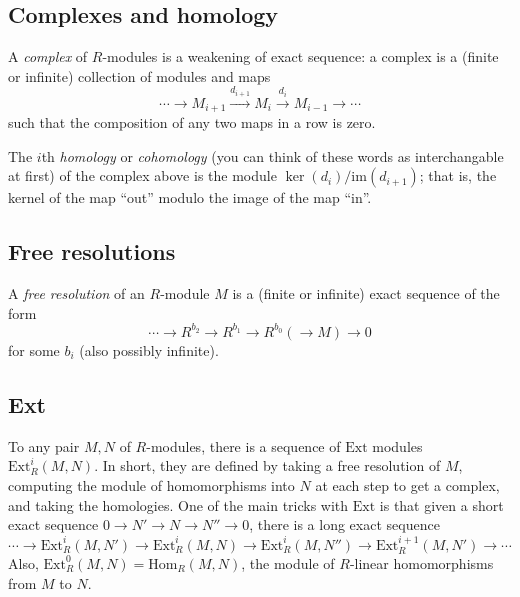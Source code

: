 \documentclass[12pt]{amsart}
\begin{document}
\subsection*{Complexes and homology} A \emph{complex} of $R$-modules is a weakening of exact sequence: a complex is a (finite or infinite) collection of modules and maps
\[ \cdots  \rightarrow M_{i+1} \xrightarrow{d_{i+1}} M_{i} \xrightarrow{d_{i}} M_{i-1} \rightarrow \cdots\]
such that the composition of any two maps in a row is zero.

The $i$th \emph{homology} or \emph{cohomology} (you can think of these words as interchangable at first) of the complex above is the module $\ker(d_i)/\mathrm{im}(d_{i+1})$; that is, the kernel of the map ``out'' modulo the image of the map ``in''.

\subsection*{Free resolutions} A \emph{free resolution} of an $R$-module $M$ is a (finite or infinite) exact sequence of the form
\[ \cdots\to  R^{b_2} \rightarrow R^{b_1} \rightarrow R^{b_0}(  \rightarrow M) \to 0\]
for some $b_i$ (also possibly infinite). 



\subsection*{Ext} To any pair $M,N$ of $R$-modules, there is a sequence of $\mathrm{Ext}$ modules $\mathrm{Ext}^i_R(M,N)$. In short, they are defined by taking a free resolution of $M$, computing the module of homomorphisms into $N$ at each step to get a complex, and taking the homologies. One of the main tricks with $\mathrm{Ext}$ is that given a short exact sequence $0\to N' \to N \to N'' \to 0$, there is a long exact sequence
\[ \cdots \to \mathrm{Ext}^i_R(M,N') \to \mathrm{Ext}^i_R(M,N) \to \mathrm{Ext}^i_R(M,N'') \to \mathrm{Ext}^{i+1}_R(M,N') \to \cdots\]
Also, $\mathrm{Ext}^0_R(M,N)=\mathrm{Hom}_R(M,N)$, the module of $R$-linear homomorphisms from $M$ to $N$.
\end{document}
